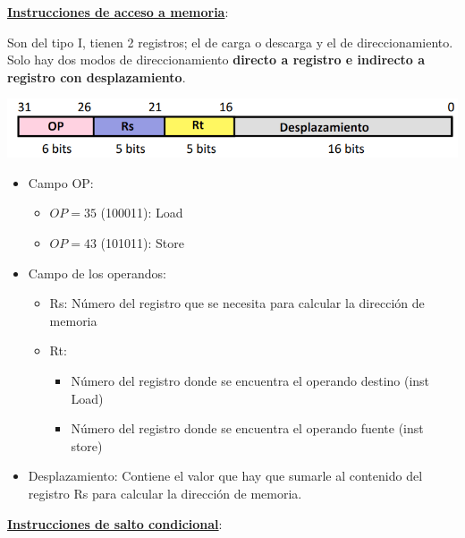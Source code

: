 \documentclass[a4paper,10pt]{book}
\begin{document}
\underline{\textbf{Instrucciones de acceso a memoria}}:

Son del tipo I, tienen 2 registros; el de carga o descarga y el de direccionamiento. Solo hay dos modos de direccionamiento \textbf{directo a registro e indirecto a registro con desplazamiento}.
\begin{center}
\includegraphics[scale=0.5]{instrucciones de acceso a memoria}
\end{center}
\begin{itemize}
\item Campo OP:
	\begin{itemize}
	\item $OP=35$ (100011): Load
	\item $OP=43$ (101011): Store
	\end{itemize}
\item Campo de los operandos:
	\begin{itemize}
	\item Rs: Número del registro que se necesita para calcular la dirección de memoria
	\item Rt:
		\begin{itemize}
		\item Número del registro donde se encuentra el operando destino (inst Load)
		\item Número del registro donde se encuentra el operando fuente (inst store)
		\end{itemize}
	
	\end{itemize}
\item Desplazamiento: Contiene el valor que hay que sumarle al contenido del registro Rs para calcular la dirección de memoria.
\end{itemize}

\underline{\textbf{Instrucciones de salto condicional}}:
\end{document}
